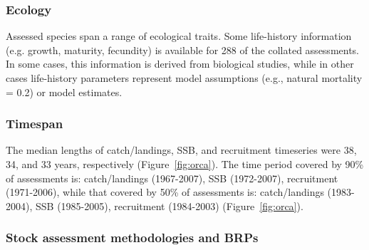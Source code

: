 \subsubsection*{Ecology}
Assessed species span a range of ecological traits. Some life-history
information (e.g. growth, maturity, fecundity) is available for
288 of the collated assessments. In some cases, this
information is derived from biological studies, while in other cases
life-history parameters represent model assumptions (e.g., natural
mortality = 0.2) or model estimates. 





\subsubsection*{Timespan }


The median lengths of catch/landings, SSB, and recruitment timeseries
were 38, 34, and 33
years, respectively (Figure~\ref{fig:orca}).  The time period covered by 90\% of assessments
is: catch/landings (1967-2007), SSB
(1972-2007), recruitment (1971-2006), while that
covered by 50\% of assessments is: catch/landings
(1983-2004), SSB (1985-2005), recruitment
(1984-2003) (Figure~\ref{fig:orca}).

\subsubsection*{Stock assessment methodologies and BRPs}

